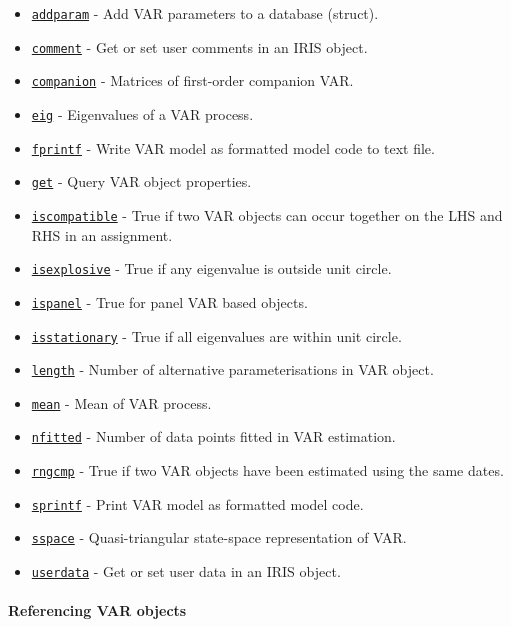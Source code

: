 \begin{itemize}
\itemsep1pt\parskip0pt
\item
  \href{VAR/addparam}{\texttt{addparam}} - Add VAR parameters to a
  database (struct).
\item
  \href{VAR/comment}{\texttt{comment}} - Get or set user comments in an
  IRIS object.
\item
  \href{VAR/companion}{\texttt{companion}} - Matrices of first-order
  companion VAR.
\item
  \href{VAR/eig}{\texttt{eig}} - Eigenvalues of a VAR process.
\item
  \href{VAR/fprintf}{\texttt{fprintf}} - Write VAR model as formatted
  model code to text file.
\item
  \href{VAR/get}{\texttt{get}} - Query VAR object properties.
\item
  \href{VAR/iscompatible}{\texttt{iscompatible}} - True if two VAR
  objects can occur together on the LHS and RHS in an assignment.
\item
  \href{VAR/isexplosive}{\texttt{isexplosive}} - True if any eigenvalue
  is outside unit circle.
\item
  \href{VAR/ispanel}{\texttt{ispanel}} - True for panel VAR based
  objects.
\item
  \href{VAR/isstationary}{\texttt{isstationary}} - True if all
  eigenvalues are within unit circle.
\item
  \href{VAR/length}{\texttt{length}} - Number of alternative
  parameterisations in VAR object.
\item
  \href{VAR/mean}{\texttt{mean}} - Mean of VAR process.
\item
  \href{VAR/nfitted}{\texttt{nfitted}} - Number of data points fitted in
  VAR estimation.
\item
  \href{VAR/rngcmp}{\texttt{rngcmp}} - True if two VAR objects have been
  estimated using the same dates.
\item
  \href{VAR/sprintf}{\texttt{sprintf}} - Print VAR model as formatted
  model code.
\item
  \href{VAR/sspace}{\texttt{sspace}} - Quasi-triangular state-space
  representation of VAR.
\item
  \href{VAR/userdata}{\texttt{userdata}} - Get or set user data in an
  IRIS object.
\end{itemize}

\paragraph{Referencing VAR objects}\label{referencing-var-objects}

